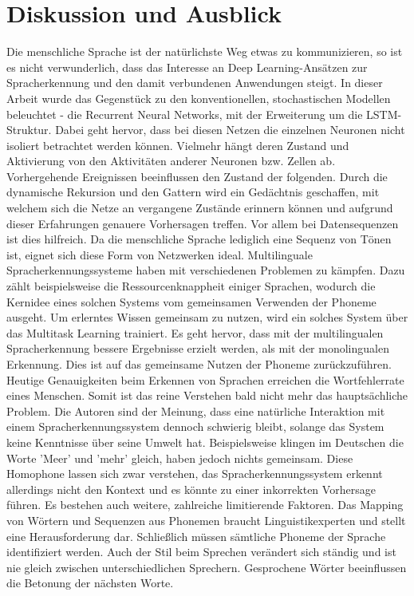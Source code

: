 \section{Diskussion und Ausblick}
Die menschliche Sprache ist der natürlichste Weg etwas zu kommunizieren, so ist es nicht verwunderlich, dass das Interesse an Deep Learning-Ansätzen zur Spracherkennung und den damit verbundenen Anwendungen steigt. In dieser Arbeit wurde das Gegenstück zu den konventionellen, stochastischen Modellen beleuchtet - die Recurrent Neural Networks, mit der Erweiterung um die LSTM-Struktur. Dabei geht hervor, dass bei diesen Netzen die einzelnen Neuronen nicht isoliert betrachtet werden können. Vielmehr hängt deren Zustand und Aktivierung von den Aktivitäten anderer Neuronen bzw. Zellen ab. Vorhergehende Ereignissen beeinflussen den Zustand der folgenden. Durch die dynamische Rekursion und den Gattern wird ein Gedächtnis geschaffen, mit welchem sich die Netze an vergangene Zustände erinnern können und aufgrund dieser Erfahrungen genauere Vorhersagen treffen. Vor allem bei Datensequenzen ist dies hilfreich. Da die menschliche Sprache lediglich eine Sequenz von Tönen ist, eignet sich diese Form von Netzwerken ideal.\newline
Multilinguale Spracherkennungssysteme haben mit verschiedenen Problemen zu kämpfen. Dazu zählt beispielsweise die Ressourcenknappheit einiger Sprachen, wodurch die Kernidee eines solchen Systems vom gemeinsamen Verwenden der Phoneme ausgeht. Um erlerntes Wissen gemeinsam zu nutzen, wird ein solches System über das Multitask Learning trainiert. Es geht hervor, dass mit der multilingualen Spracherkennung bessere Ergebnisse erzielt werden, als mit der monolingualen Erkennung. Dies ist auf das gemeinsame Nutzen der Phoneme zurückzuführen. Heutige Genauigkeiten beim Erkennen von Sprachen erreichen die Wortfehlerrate eines Menschen. Somit ist das reine Verstehen bald nicht mehr das hauptsächliche Problem. Die Autoren sind der Meinung, dass eine natürliche Interaktion mit einem Spracherkennungssystem dennoch schwierig bleibt, solange das System keine Kenntnisse über seine Umwelt hat. Beispielsweise klingen im Deutschen die Worte 'Meer' und 'mehr' gleich, haben jedoch nichts gemeinsam. Diese Homophone lassen sich zwar verstehen, das Spracherkennungssystem erkennt allerdings nicht den Kontext und es könnte zu einer inkorrekten Vorhersage führen. Es bestehen auch weitere, zahlreiche limitierende Faktoren. Das Mapping von Wörtern und Sequenzen aus Phonemen braucht Linguistikexperten und stellt eine Herausforderung dar. Schließlich müssen sämtliche Phoneme der Sprache identifiziert werden. Auch der Stil beim Sprechen verändert sich ständig und ist nie gleich zwischen unterschiedlichen Sprechern. Gesprochene Wörter beeinflussen die Betonung der nächsten Worte.\newline
